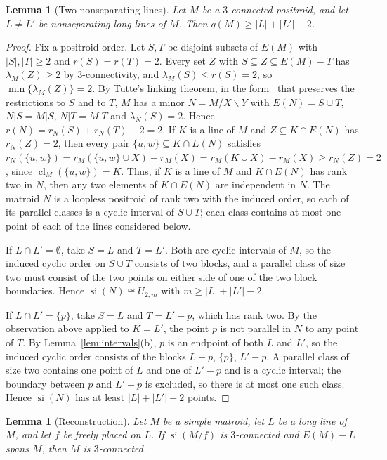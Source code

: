 \documentclass[11pt]{amsart}
\newtheorem{lemma}[theorem]{Lemma}
\theoremstyle{definition}
\theoremstyle{remark}
\numberwithin{equation}{section}
\newcommand{\cl}{\operatorname{cl}}
\newcommand{\si}{\operatorname{si}}
\newcommand{\lam}{\lambda}
\begin{document}
\begin{lemma}[Two nonseparating lines]\label{lem:twolines}
Let $M$ be a $3$-connected positroid, and let $L\ne L'$ be nonseparating long lines of $M$. Then $q(M)\ge|L|+|L'|-2$.
\end{lemma}

\begin{proof}
Fix a positroid order. Let $S,T$ be disjoint subsets of $E(M)$ with $|S|,|T|\ge2$ and $r(S)=r(T)=2$. Every set $Z$ with $S\subseteq Z\subseteq E(M)-T$ has $\lam_M(Z)\ge2$ by $3$-connectivity, and $\lam_M(S)\le r(S)=2$, so $\min\{\lam_M(Z)\}=2$. By Tutte's linking theorem, in the form~\cite[Theorem~8.5.7]{Oxl11} that preserves the restrictions to $S$ and to $T$, $M$ has a minor $N=M/X\backslash Y$ with $E(N)=S\cup T$, $N|S=M|S$, $N|T=M|T$ and $\lam_N(S)=2$. Hence $r(N)=r_N(S)+r_N(T)-2=2$. If $K$ is a line of $M$ and $Z\subseteq K\cap E(N)$ has $r_N(Z)=2$, then every pair $\{u,w\}\subseteq K\cap E(N)$ satisfies $r_N(\{u,w\})=r_M(\{u,w\}\cup X)-r_M(X)=r_M(K\cup X)-r_M(X)\ge r_N(Z)=2$, since $\cl_M(\{u,w\})=K$. Thus, if $K$ is a line of $M$ and $K\cap E(N)$ has rank two in $N$, then any two elements of $K\cap E(N)$ are independent in $N$. The matroid $N$ is a loopless positroid of rank two with the induced order, so each of its parallel classes is a cyclic interval of $S\cup T$; each class contains at most one point of each of the lines considered below.

If $L\cap L'=\emptyset$, take $S=L$ and $T=L'$. Both are cyclic intervals of $M$, so the induced cyclic order on $S\cup T$ consists of two blocks, and a parallel class of size two must consist of the two points on either side of one of the two block boundaries. Hence $\si(N)\cong U_{2,m}$ with $m\ge|L|+|L'|-2$.

If $L\cap L'=\{p\}$, take $S=L$ and $T=L'-p$, which has rank two. By the observation above applied to $K=L'$, the point $p$ is not parallel in $N$ to any point of $T$. By Lemma~\ref{lem:intervals}(b), $p$ is an endpoint of both $L$ and $L'$, so the induced cyclic order consists of the blocks $L-p$, $\{p\}$, $L'-p$. A parallel class of size two contains one point of $L$ and one of $L'-p$ and is a cyclic interval; the boundary between $p$ and $L'-p$ is excluded, so there is at most one such class. Hence $\si(N)$ has at least $|L|+|L'|-2$ points.
\end{proof}

\begin{lemma}[Reconstruction]\label{lem:reconstruct}
Let $M$ be a simple matroid, let $L$ be a long line of $M$, and let $f$ be freely placed on $L$. If $\si(M/f)$ is $3$-connected and $E(M)-L$ spans $M$, then $M$ is $3$-connected.
\end{lemma}
\end{document}
